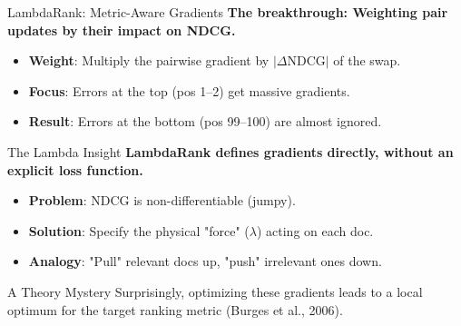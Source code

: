 \documentclass[aspectratio=169]{beamer}
\newif\ifanimated
\newcommand{\cpause}{\ifanimated\pause\fi}
\begin{document}
\begin{frame}[plain]
\sectionpage
\end{frame}

\begin{frame}{LambdaRank: Metric-Aware Gradients}
\textbf{The breakthrough: Weighting pair updates by their impact on NDCG.}

\vspace{0.8em}
\begin{itemize}
    \item \textbf{Weight}: Multiply the pairwise gradient by $|\Delta\text{NDCG}|$ of the swap.
    \item \textbf{Focus}: Errors at the top (pos 1--2) get massive gradients.
    \item \textbf{Result}: Errors at the bottom (pos 99--100) are almost ignored.
\end{itemize}\cpause

\vspace{0.5em}
\cpause
\begin{center}
\end{center}
\end{frame}

\begin{frame}{The Lambda Insight}
\textbf{LambdaRank defines gradients directly, without an explicit loss function.}

\vspace{0.8em}
\begin{itemize}
    \item \textbf{Problem}: NDCG is non-differentiable (jumpy).
    \item \textbf{Solution}: Specify the physical "force" ($\lambda$) acting on each doc.
    \item \textbf{Analogy}: "Pull" relevant docs up, "push" irrelevant ones down.
\end{itemize}\cpause

\vspace{1em}
\cpause
\begin{alertblock}{A Theory Mystery}
Surprisingly, optimizing these gradients leads to a local optimum for the target ranking metric (Burges et al., 2006).
\end{alertblock}
\end{frame}
\end{document}
